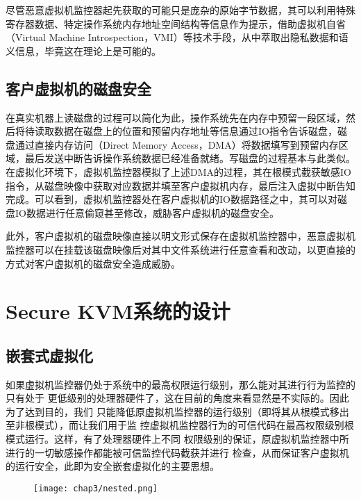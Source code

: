 尽管恶意虚拟机监控器起先获取的可能只是庞杂的原始字节数据，其可以利用特殊寄存器数据、特定操作系统内存地址空间结构等信息作为提示，借助虚拟机自省（Virtual Machine Introspection，VMI）等技术手段，从中萃取出隐私数据和语义信息，毕竟这在理论上是可能的。

\subsection{客户虚拟机的磁盘安全}

在真实机器上读磁盘的过程可以简化为此，操作系统先在内存中预留一段区域，然后将待读取数据在磁盘上的位置和预留内存地址等信息通过IO指令告诉磁盘，磁盘通过直接内存访问（Direct Memory Access，DMA）将数据填写到预留内存区域，最后发送中断告诉操作系统数据已经准备就绪。写磁盘的过程基本与此类似。在虚拟化环境下，虚拟机监控器模拟了上述DMA的过程，其在根模式截获敏感IO指令，从磁盘映像中获取对应数据并填至客户虚拟机内存，最后注入虚拟中断告知完成。可以看到，虚拟机监控器处在客户虚拟机的IO数据路径之中，其可以对磁盘IO数据进行任意偷窥甚至修改，威胁客户虚拟机的磁盘安全。

此外，客户虚拟机的磁盘映像直接以明文形式保存在虚拟机监控器中，恶意虚拟机监控器可以在挂载该磁盘映像后对其中文件系统进行任意查看和改动，以更直接的方式对客户虚拟机的磁盘安全造成威胁。



\section{Secure KVM系统的设计}

\subsection{嵌套式虚拟化}

如果虚拟机监控器仍处于系统中的最高权限运行级别，那么能对其进行行为监控的只有处于
更低级别的处理器硬件了，这在目前的角度来看显然是不实际的。因此为了达到目的，我们
只能降低原虚拟机监控器的运行级别（即将其从根模式移出至非根模式），而让我们用于监
控虚拟机监控器行为的可信代码在最高权限级别根模式运行。这样，有了处理器硬件上不同
权限级别的保证，原虚拟机监控器中所进行的一切敏感操作都能被可信监控代码截获并进行
检查，从而保证客户虚拟机的运行安全，此即为安全嵌套虚拟化的主要思想。

\begin{figure}[!htp]
  \centering
  \texttt{[image: chap3/nested.png]}
\end{figure}

